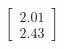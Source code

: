 \documentclass[preview]{standalone}
\begin{document}
\begin{align*}
\begin{bmatrix} 2.01 \\ 2.43 \end{bmatrix}
\end{align*}
\end{document}
